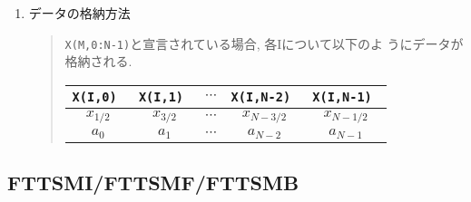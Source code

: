 \documentclass[a4j]{jarticle}
\begin{document}
\begin{enumerate}
  \item データの格納方法
  \begin{quote}
  
  {\tt X(M,0:N-1)}と宣言されている場合, 各Iについて以下のよ
   うにデータが格納される.

    \begin{tabular}{|c|c|c|c|c|}\hline
     \tt X(I,0) & \tt X(I,1) & 
     $\cdots$ & \tt X(I,N-2) & \tt X(I,N-1) \\\hline\hline
      $x_{1/2}$ & $x_{3/2}$ & 
     $\cdots$ & $x_{N-3/2}$ & $x_{N-1/2}$ \\\hline
      $a_0$ & $a_1$ & 
     $\cdots$ & $a_{N-2}$ & $a_{N-1}$ \\\hline
    \end{tabular}
  \end{quote}
  
\end{enumerate}

\subsection{FTTSMI/FTTSMF/FTTSMB}
\end{document}
